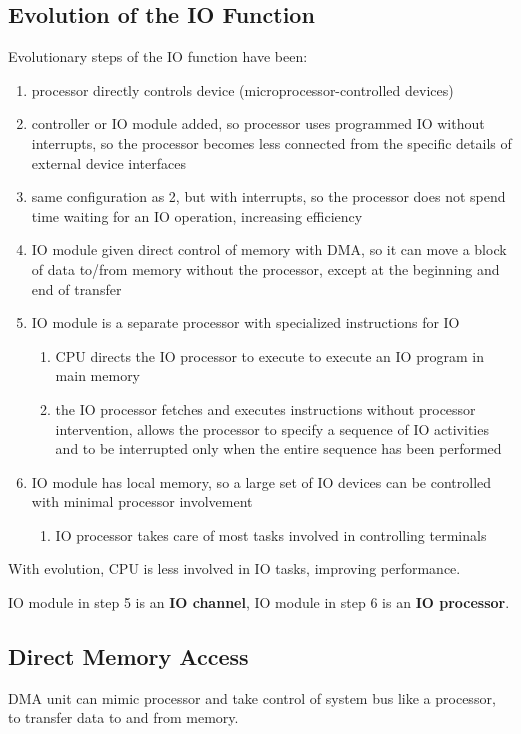 \documentclass[11pt]{article}
\begin{document}
\subsection{Evolution of the IO Function}
\label{sec:org6068354}
Evolutionary steps of the IO function have been:
\begin{enumerate}
\item processor directly controls device (microprocessor-controlled devices)
\item controller or IO module added, so processor uses programmed IO without interrupts, so the
processor becomes less connected from the specific details of external device interfaces
\item same configuration as 2, but with interrupts, so the processor does not spend time waiting
for an IO operation, increasing efficiency
\item IO module given direct control of memory with DMA, so it can move a block of data to/from
memory without the processor, except at the beginning and end of transfer
\item IO module is a separate processor with specialized instructions for IO
\begin{enumerate}
\item CPU directs the IO processor to execute to execute an IO program in main memory
\item the IO processor fetches and executes instructions without processor intervention, allows
the processor to specify a sequence of IO activities and to be interrupted only when
the entire sequence has been performed
\end{enumerate}
\item IO module has local memory, so a large set of IO devices can be controlled with minimal
processor involvement
\begin{enumerate}
\item IO processor takes care of most tasks involved in controlling terminals
\end{enumerate}
\end{enumerate}

With evolution, CPU is less involved in IO tasks, improving performance.

IO module in step 5 is an \textbf{IO channel}, IO module in step 6 is an \textbf{IO processor}.
\subsection{Direct Memory Access}
\label{sec:orgec049d6}
DMA unit can mimic processor and take control of system bus like a processor, to transfer data
to and from memory.
\end{document}
